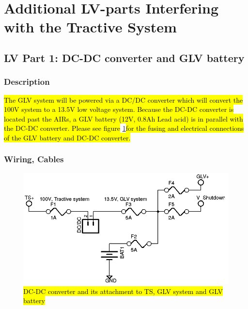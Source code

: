 \documentclass{article}
\DeclareRobustCommand{\hlr}[1]{{\sethlcolor{red}\hl{#1}}}
\begin{document}
\newpage

\section{Additional LV-parts Interfering with the Tractive System}

    \subsection{LV Part 1: DC-DC converter and GLV battery}

        \subsubsection{Description}


            \hlr{The GLV system will be powered via a DC/DC converter which will convert the 100V system to a 13.5V low voltage system. Because the DC-DC converter is located past the AIRs, a GLV battery (12V, 0.8Ah Lead acid) is in parallel with the DC-DC converter. Please see figure} \ref{glvfusing}\hlr{for the fusing and electrical connections of the GLV battery and DC-DC converter.}


        \subsubsection{Wiring, Cables}

            \begin{figure}[H]
                \centering
                \includegraphics{glvfusing}
                \caption{\hlr{DC-DC converter and its attachment to TS, GLV system and GLV battery}}
                \label{glvfusing}
            \end{figure}

\end{document}
